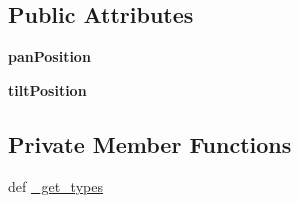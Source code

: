 \subsection*{\-Public \-Attributes}
\begin{DoxyCompactItemize}
\item 
\hypertarget{class_c_i_t_i_u_s___control___communication_1_1msg_1_1__msg__pan_tilt_position_1_1msg__pan_tilt_position_a4f62d6583a6d064cde62dc684b89386f}{{\bfseries pan\-Position}}\label{class_c_i_t_i_u_s___control___communication_1_1msg_1_1__msg__pan_tilt_position_1_1msg__pan_tilt_position_a4f62d6583a6d064cde62dc684b89386f}

\item 
\hypertarget{class_c_i_t_i_u_s___control___communication_1_1msg_1_1__msg__pan_tilt_position_1_1msg__pan_tilt_position_a81b3e5db0a84daef5f51b3216bd22fc8}{{\bfseries tilt\-Position}}\label{class_c_i_t_i_u_s___control___communication_1_1msg_1_1__msg__pan_tilt_position_1_1msg__pan_tilt_position_a81b3e5db0a84daef5f51b3216bd22fc8}

\end{DoxyCompactItemize}
\subsection*{\-Private \-Member \-Functions}
\begin{DoxyCompactItemize}
\item 
def \hyperlink{class_c_i_t_i_u_s___control___communication_1_1msg_1_1__msg__pan_tilt_position_1_1msg__pan_tilt_position_a8c8629c5038d8448a6be736b9140a861}{\-\_\-get\-\_\-types}
\end{DoxyCompactItemize}
